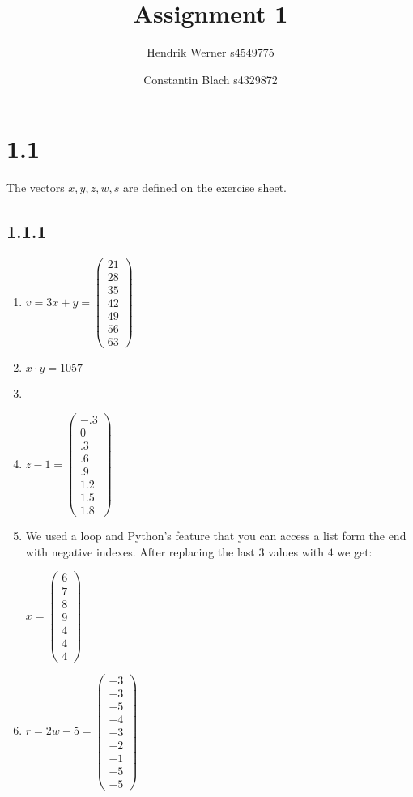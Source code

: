 \documentclass[12pt]{article}
\author{
	Hendrik Werner s4549775
	\and Constantin Blach s4329872
}
\title{Assignment 1}
\begin{document}
\maketitle

\section*{1.1}
The vectors $x, y, z, w, s$ are defined on the exercise sheet.

\subsection*{1.1.1}
\begin{enumerate}[a]
	\item %
	$v = 3x + y =
	\begin{pmatrix}
		21\\ 28\\ 35\\ 42\\ 49\\ 56\\ 63
	\end{pmatrix}$

	\item %
	$x \cdotp y = 1057$

	\item %
	\item %
	$z - 1 =
	\begin{pmatrix}
		-.3\\ 0\\ .3\\ .6\\ .9\\ 1.2\\ 1.5\\ 1.8
	\end{pmatrix}$

	\item %
	We used a loop and Python's feature that you can access a list form the end with negative indexes. After replacing the last 3 values with $4$ we get:

	$x =
	\begin{pmatrix}
		6\\ 7\\ 8\\ 9\\ 4\\ 4\\ 4
	\end{pmatrix}$

	\item %
	$r = 2w - 5 =
	\begin{pmatrix}
		-3\\ -3\\ -5\\ -4\\ -3\\ -2\\ -1\\ -5\\ -5
	\end{pmatrix}$
\end{enumerate}
\end{document}
